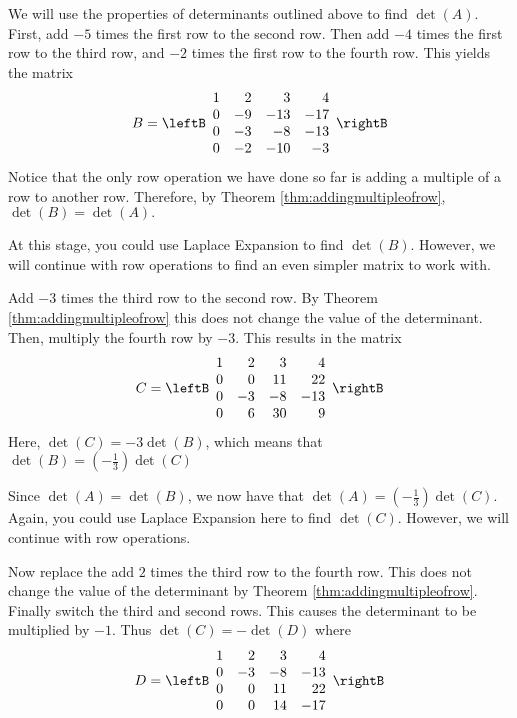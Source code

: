 \begin{solution}
We will use the properties of determinants outlined above to find $\det \left(A\right)$. First, add $-5$ times the first row to the second row. Then add $-4$ times the first row to the third row, and $-2$ times
the first row to the fourth row. This yields the matrix
\begin{equation*}
B=\leftB
\begin{array}{rrrr}
1 & 2 & 3 & 4 \\
0 & -9 & -13 & -17 \\
0 & -3 & -8 & -13 \\
0 & -2 & -10 & -3
\end{array}
\rightB
\end{equation*}
Notice that the only row operation we have done so far is adding a multiple 
of a row to another row. Therefore, by Theorem \ref{thm:addingmultipleofrow}, $\det \left(B\right) = \det \left(A\right).$ 

At this stage, you could use Laplace Expansion to find $\det \left(B\right)$. However, we will continue with row operations 
to find an even simpler matrix to work with.

Add $-3$ times the third row to the second row. By Theorem \ref{thm:addingmultipleofrow} this does not change the value of
the determinant. Then, multiply the fourth row by $-3$. This results in the matrix
\begin{equation*}
C=\leftB
\begin{array}{rrrr}
1 & 2 & 3 & 4 \\
0 & 0 & 11 & 22 \\
0 & -3 & -8 & -13 \\
0 & 6 & 30 & 9
\end{array}
\rightB 
\end{equation*}
Here, $\det \left(C\right) = -3 \det \left(B\right)$, which means that 
$\det \left( B\right) =\left(-\frac{1}{3}\right) \det \left( C\right) $

Since $\det \left(A\right) = \det \left(B\right)$, we now have that 
$\det \left(A\right) = \left(-\frac{1}{3}\right) \det \left( C\right)$. Again, you could use Laplace Expansion here to find $\det \left(C\right)$. However,
we will continue with row operations.

Now replace the add $2$ times the third row to the fourth row. This does not change the
value of the determinant by Theorem \ref{thm:addingmultipleofrow}. Finally switch the third
and second rows. This causes the determinant to be multiplied by $-1.$ Thus $\det \left( C\right) = -\det \left( D\right) $ where
\begin{equation*}
D=\leftB 
\begin{array}{rrrr}
1 & 2 & 3 & 4 \\
0 & -3 & -8 & -13 \\
0 & 0 & 11 & 22 \\
0 & 0 & 14 & -17
\end{array}
\rightB
\end{equation*}


\end{solution}
